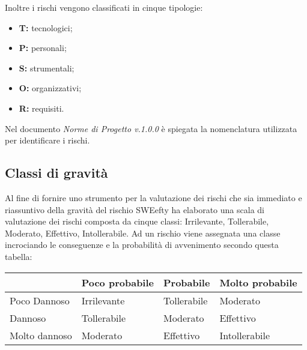 Inoltre i rischi vengono classificati in cinque tipologie:
\begin{itemize}
	\item \textbf{T:} tecnologici;
	\item \textbf{P:} personali;
	\item \textbf{S:} strumentali;
	\item \textbf{O:} organizzativi;
	\item \textbf{R:} requisiti.
\end{itemize}

Nel documento \emph{Norme di Progetto v.1.0.0} è spiegata la nomenclatura utilizzata per identificare i rischi.

\subsection{Classi di gravità}
Al fine di fornire uno strumento per la valutazione dei rischi che sia immediato e riassuntivo della gravità del rischio SWEefty ha elaborato una scala di valutazione dei rischi composta da cinque classi: Irrilevante, Tollerabile, Moderato, Effettivo, Intollerabile. Ad un rischio viene assegnata una classe incrociando le conseguenze e la probabilità di avvenimento secondo questa tabella:
\begin{table}[H]
	\centering
	\begin{tabular}{|C{3cm}|C{3cm}|C{3cm}|C{3cm}|}
		\hline
		~             & Poco probabile & Probabile   & Molto probabile \\ \hline
		Poco Dannoso  & Irrilevante    & Tollerabile & Moderato        \\ \hline
		Dannoso       & Tollerabile    & Moderato    & Effettivo       \\ \hline
		Molto dannoso & Moderato       & Effettivo   & Intollerabile   \\
		\hline
	\end{tabular}
\end{table}

